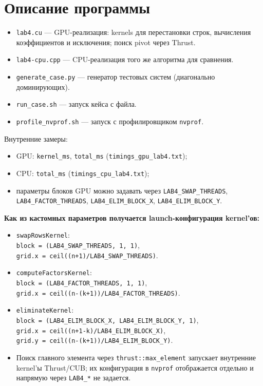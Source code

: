 \documentclass[a4paper,14pt]{extarticle}
\begin{document}
\section*{Описание программы}
\begin{itemize}
    \item \texttt{lab4.cu} --- GPU-реализация: kernels для перестановки строк,
    вычисления коэффициентов и исключения; поиск pivot через Thrust.
    \item \texttt{lab4-cpu.cpp} --- CPU-реализация того же алгоритма для сравнения.
    \item \texttt{generate\_case.py} --- генератор тестовых систем (диагонально доминирующих).
    \item \texttt{run\_case.sh} --- запуск кейса с файла.
    \item \texttt{profile\_nvprof.sh} --- запуск с профилировщиком \texttt{nvprof}.
\end{itemize}

Внутренние замеры:
\begin{itemize}
    \item GPU: \texttt{kernel\_ms}, \texttt{total\_ms} (\texttt{timings\_gpu\_lab4.txt});
    \item CPU: \texttt{total\_ms} (\texttt{timings\_cpu\_lab4.txt});
    \item параметры блоков GPU можно задавать через
    \texttt{LAB4\_SWAP\_THREADS}, \texttt{LAB4\_FACTOR\_THREADS},
    \texttt{LAB4\_ELIM\_BLOCK\_X}, \texttt{LAB4\_ELIM\_BLOCK\_Y}.
\end{itemize}

\textbf{Как из кастомных параметров получается launch-конфигурация kernel'ов:}
\begin{itemize}
    \item \texttt{swapRowsKernel}:\\
    \texttt{block = (LAB4\_SWAP\_THREADS, 1, 1)},\\
    \texttt{grid.x = ceil((n+1)/LAB4\_SWAP\_THREADS)}.
    \item \texttt{computeFactorsKernel}:\\
    \texttt{block = (LAB4\_FACTOR\_THREADS, 1, 1)},\\
    \texttt{grid.x = ceil((n-(k+1))/LAB4\_FACTOR\_THREADS)}.
    \item \texttt{eliminateKernel}:\\
    \texttt{block = (LAB4\_ELIM\_BLOCK\_X, LAB4\_ELIM\_BLOCK\_Y, 1)},\\
    \texttt{grid.x = ceil((n+1-k)/LAB4\_ELIM\_BLOCK\_X)},\\
    \texttt{grid.y = ceil((n-(k+1))/LAB4\_ELIM\_BLOCK\_Y)}.
    \item Поиск главного элемента через \texttt{thrust::max\_element}
    запускает внутренние kernel'ы Thrust/CUB; их конфигурация в \texttt{nvprof}
    отображается отдельно и напрямую через \texttt{LAB4\_*} не задается.
\end{itemize}
\end{document}
